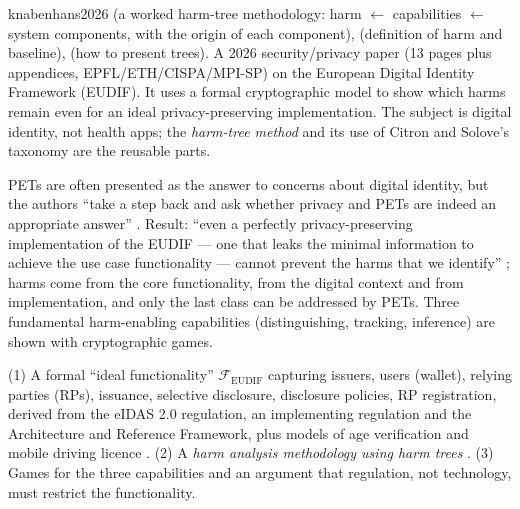 \begin{papercard}{knabenhans2026}
  (a worked harm-tree methodology: harm $\leftarrow$ capabilities $\leftarrow$ system components, with the origin of each component),  (definition of harm and baseline),  (how to present trees). A 2026 security/privacy paper (13 pages plus appendices, EPFL/ETH/CISPA/MPI-SP) on the European Digital Identity Framework (EUDIF). It uses a formal cryptographic model to show which harms remain even for an ideal privacy-preserving implementation. The subject is digital identity, not health apps; the \emph{harm-tree method} and its use of Citron and Solove's taxonomy are the reusable parts.

 PETs are often presented as the answer to concerns about digital identity, but the authors ``take a step back and ask whether privacy and PETs are indeed an appropriate answer'' . Result: ``even a perfectly privacy-preserving implementation of the EUDIF --- one that leaks the minimal information to achieve the use case functionality --- cannot prevent the harms that we identify'' ; harms come from the core functionality, from the digital context and from implementation, and only the last class can be addressed by PETs. Three fundamental harm-enabling capabilities (distinguishing, tracking, inference) are shown with cryptographic games.

 (1) A formal ``ideal functionality'' $\mathcal{F}_{\text{EUDIF}}$ capturing issuers, users (wallet), relying parties (RPs), issuance, selective disclosure, disclosure policies, RP registration, derived from the eIDAS 2.0 regulation, an implementing regulation and the Architecture and Reference Framework, plus models of age verification and mobile driving licence . (2) A \emph{harm analysis methodology using harm trees} . (3) Games for the three capabilities and an argument that regulation, not technology, must restrict the functionality.


\end{papercard}
